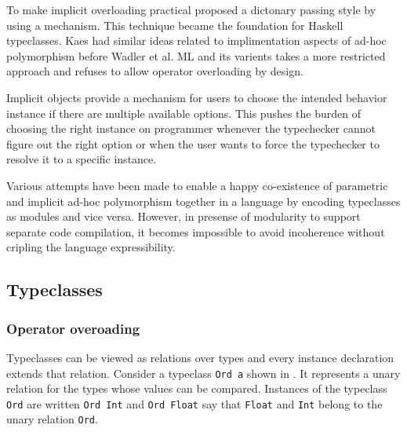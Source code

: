 \documentclass[manuscript,screen,nonacm]{acmart}
\begin{document}
To make implicit overloading practical \citet{wadler_polymorphism_1989} proposed a dictonary passing style by using a mechanism. This technique became the foundation for Haskell\cite{haskell_2010} typeclasses. Kaes had similar ideas related to implimentation aspects of ad-hoc polymorphism before Wadler et al. ML and its varients\cite{milner_definition_1997,leroy_ocaml_2023} takes a more restricted approach and refuses to allow operator overloading by design.

Implicit objects\cite{oliveira_typeclasses_2010} provide a mechanism for users to choose the intended behavior instance if there are multiple available options. This pushes the burden of choosing the right instance on programmer whenever the typechecker cannot figure out the right option or when the user wants to force the typechecker to resolve it to a specific instance.

Various attempts\cite{dreyer_modular_2007, wehr_ml_2008, white_modular_2014} have been made to enable a happy co-existence of parametric and implicit ad-hoc polymorphism together in a language by encoding typeclasses as modules and vice versa. However, in presense of modularity to support separate code compilation, it becomes impossible to avoid incoherence without cripling the language expressibility.

\subsection{Typeclasses}
\subsubsection{Operator overoading}
Typeclasses can be viewed as relations over types and every instance declaration extends that relation. Consider a typeclass \lstinline{Ord a} shown in . It represents a unary relation for the types whose values can be compared. Instances of the typeclass \lstinline{Ord} are written \lstinline{Ord Int} and \lstinline{Ord Float} say that \lstinline{Float} and \lstinline{Int} belong to the unary relation \lstinline{Ord}.

\end{document}
